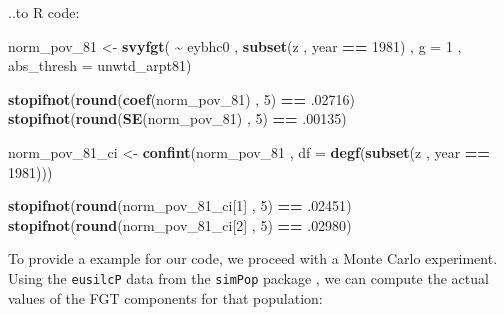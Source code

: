 \documentclass[
]{book}
\newenvironment{Shaded}{\begin{snugshade}}{\end{snugshade}}
\newcommand{\AttributeTok}[1]{\textcolor[rgb]{0.13,0.29,0.53}{#1}}
\newcommand{\DecValTok}[1]{\textcolor[rgb]{0.00,0.00,0.81}{#1}}
\newcommand{\FunctionTok}[1]{\textcolor[rgb]{0.13,0.29,0.53}{\textbf{#1}}}
\newcommand{\NormalTok}[1]{#1}
\newcommand{\OtherTok}[1]{\textcolor[rgb]{0.56,0.35,0.01}{#1}}
\newcommand{\SpecialCharTok}[1]{\textcolor[rgb]{0.81,0.36,0.00}{\textbf{#1}}}
\begin{document}
..to R code:

\begin{Shaded}
\begin{Highlighting}[]
\NormalTok{norm\_pov\_81 }\OtherTok{\textless{}{-}}
  \FunctionTok{svyfgt}\NormalTok{( }\SpecialCharTok{\textasciitilde{}}\NormalTok{ eybhc0 ,}
          \FunctionTok{subset}\NormalTok{(z , year }\SpecialCharTok{==} \DecValTok{1981}\NormalTok{) ,}
          \AttributeTok{g =} \DecValTok{1}\NormalTok{ ,}
          \AttributeTok{abs\_thresh =}\NormalTok{ unwtd\_arpt81)}


\FunctionTok{stopifnot}\NormalTok{(}\FunctionTok{round}\NormalTok{(}\FunctionTok{coef}\NormalTok{(norm\_pov\_81) , }\DecValTok{5}\NormalTok{) }\SpecialCharTok{==}\NormalTok{ .}\DecValTok{02716}\NormalTok{)}
\FunctionTok{stopifnot}\NormalTok{(}\FunctionTok{round}\NormalTok{(}\FunctionTok{SE}\NormalTok{(norm\_pov\_81) , }\DecValTok{5}\NormalTok{) }\SpecialCharTok{==}\NormalTok{ .}\DecValTok{00135}\NormalTok{)}

\NormalTok{norm\_pov\_81\_ci }\OtherTok{\textless{}{-}}
  \FunctionTok{confint}\NormalTok{(norm\_pov\_81 , }\AttributeTok{df =} \FunctionTok{degf}\NormalTok{(}\FunctionTok{subset}\NormalTok{(z , year }\SpecialCharTok{==} \DecValTok{1981}\NormalTok{)))}

\FunctionTok{stopifnot}\NormalTok{(}\FunctionTok{round}\NormalTok{(norm\_pov\_81\_ci[}\DecValTok{1}\NormalTok{] , }\DecValTok{5}\NormalTok{) }\SpecialCharTok{==}\NormalTok{ .}\DecValTok{02451}\NormalTok{)}
\FunctionTok{stopifnot}\NormalTok{(}\FunctionTok{round}\NormalTok{(norm\_pov\_81\_ci[}\DecValTok{2}\NormalTok{] , }\DecValTok{5}\NormalTok{) }\SpecialCharTok{==}\NormalTok{ .}\DecValTok{02980}\NormalTok{)}
\end{Highlighting}
\end{Shaded}

To provide a example for our code, we proceed with a Monte Carlo experiment.
Using the \texttt{eusilcP} data from the \texttt{simPop} package \autocite{R-simPop}, we can compute the actual values of the FGT components for that population:
\end{document}
